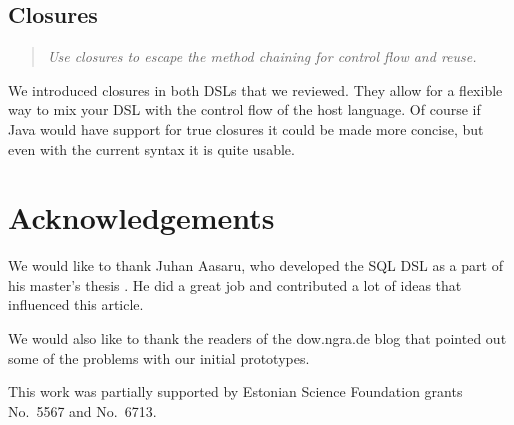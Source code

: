 \documentclass{sig-alternate}
\begin{document}
\subsection{Closures}

\begin{quote}
\emph{Use closures to escape the method chaining for control flow and reuse.}
\end{quote}

We introduced closures in both DSLs that we reviewed. They allow for a flexible way to mix your DSL with the control flow of the host language. Of course if Java would have support for true closures it could be made more concise, but even with the current syntax it is quite usable.



\section{Acknowledgements}

We would like to thank Juhan Aasaru, who developed the SQL DSL as a part of his master's thesis \cite{aasaru2008}. He did a great job and contributed a lot of ideas that influenced this article. 

We would also like to thank the readers of the dow.ngra.de blog that pointed out some of the problems with our initial prototypes.

This work was partially supported by Estonian Science Foundation grants No.\ 5567 and No.\ 6713.
\end{document}
